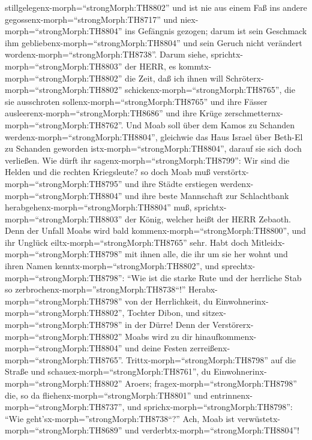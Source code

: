 stillgelegenx-morph=``strongMorph:TH8802'' und ist nie aus einem Faß ins
andere gegossenx-morph=``strongMorph:TH8717'' und
niex-morph=``strongMorph:TH8804'' ins Gefängnis gezogen; darum ist sein
Geschmack ihm gebliebenx-morph=``strongMorph:TH8804'' und sein Geruch
nicht verändert wordenx-morph=``strongMorph:TH8738''. 
Darum siehe, sprichtx-morph=``strongMorph:TH8803'' der HERR, es
kommtx-morph=``strongMorph:TH8802'' die Zeit, daß ich ihnen will
Schröterx-morph=``strongMorph:TH8802''
schickenx-morph=``strongMorph:TH8765'', die sie ausschroten
sollenx-morph=``strongMorph:TH8765'' und ihre Fässer
ausleerenx-morph=``strongMorph:TH8686'' und ihre Krüge
zerschmetternx-morph=``strongMorph:TH8762''.  Und Moab soll
über dem Kamos zu Schanden werdenx-morph=``strongMorph:TH8804'',
gleichwie das Haus Israel über Beth-El zu Schanden geworden
istx-morph=``strongMorph:TH8804'', darauf sie sich doch verließen.
 Wie dürft ihr sagenx-morph=``strongMorph:TH8799'': Wir
sind die Helden und die rechten Kriegsleute?  so doch Moab
muß verstörtx-morph=``strongMorph:TH8795'' und ihre Städte erstiegen
werdenx-morph=``strongMorph:TH8804'' und ihre beste Mannschaft zur
Schlachtbank herabgehenx-morph=``strongMorph:TH8804'' muß,
sprichtx-morph=``strongMorph:TH8803'' der König, welcher heißt der HERR
Zebaoth.  Denn der Unfall Moabs wird bald
kommenx-morph=``strongMorph:TH8800'', und ihr Unglück
eiltx-morph=``strongMorph:TH8765'' sehr.  Habt doch
Mitleidx-morph=``strongMorph:TH8798'' mit ihnen alle, die ihr um sie her
wohnt und ihren Namen kenntx-morph=``strongMorph:TH8802'', und
sprechtx-morph=``strongMorph:TH8798'': ``Wie ist die starke Rute und der
herrliche Stab so zerbrochenx-morph=''strongMorph:TH8738``!''
 Herabx-morph=``strongMorph:TH8798'' von der Herrlichkeit,
du Einwohnerinx-morph=``strongMorph:TH8802'', Tochter Dibon, und
sitzex-morph=``strongMorph:TH8798'' in der Dürre! Denn der
Verstörerx-morph=``strongMorph:TH8802'' Moabs wird zu dir
hinaufkommenx-morph=``strongMorph:TH8804'' und deine Festen
zerreißenx-morph=``strongMorph:TH8765''. 
Trittx-morph=``strongMorph:TH8798'' auf die Straße und
schauex-morph=``strongMorph:TH8761'', du
Einwohnerinx-morph=``strongMorph:TH8802'' Aroers;
fragex-morph=``strongMorph:TH8798'' die, so da
fliehenx-morph=``strongMorph:TH8801'' und
entrinnenx-morph=``strongMorph:TH8737'', und
sprichx-morph=``strongMorph:TH8798'': ``Wie
geht'sx-morph=''strongMorph:TH8738``?''  Ach, Moab ist
verwüstetx-morph=``strongMorph:TH8689'' und
verderbtx-morph=``strongMorph:TH8804''!
